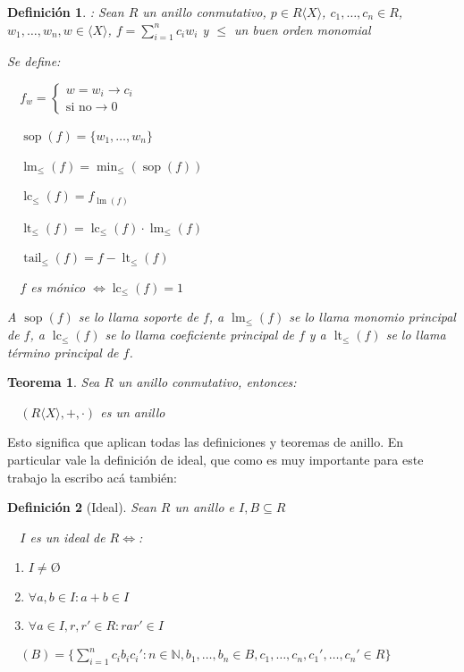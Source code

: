 \documentclass{amsbook}
\theoremstyle{customstyle}
\newtheorem{definition}{Definición}[section]
\newtheorem{theorem}{Teorema}[section]
\DeclareMathOperator{\sop}{sop}
\DeclareMathOperator{\lm}{lm}
\DeclareMathOperator{\lc}{lc}
\DeclareMathOperator{\lt}{lt}
\DeclareMathOperator{\tail}{tail}
\begin{document}
\begin{definition}: %
Sean $R$ un anillo conmutativo, $p ∈ R⟨X⟩$, $c_1, …, c_n ∈ R$, $w_1, …, w_n, w ∈ ⟨X⟩$, $f = \sum_{i = 1}^n c_i w_i$ y $≤$ un buen orden monomial

Se define:

  $f_w = \left\{\begin{array}{ll} w = w_i → c_i \\ \text{si no} → 0  \end{array} \right. $

  $\sop(f) = \{w_1, …, w_n\}$

  $\lm_≤(f) = \min_≤(\sop(f))$

  $\lc_≤(f) = f_{\lm(f)}$

  $\lt_≤(f) = \lc_≤(f) · \lm_≤(f)$

  $\tail_≤(f) = f - \lt_≤(f)$

  $f$ es mónico $⇔ \lc_≤(f) = 1$

A $\sop(f)$ se lo llama soporte de $f$, a $\lm_≤(f)$ se lo llama monomio principal de $f$, a $\lc_≤(f)$ se lo llama coeficiente principal de $f$ y a $\lt_≤(f)$ se lo llama término principal de $f$.

\end{definition}

\begin{theorem}
Sea $R$ un anillo conmutativo, entonces:

  $(R⟨X⟩, +, ·)$ es un anillo

\end{theorem}

Esto significa que aplican todas las definiciones y teoremas de anillo.
En particular vale la definición de ideal, que como es muy importante para este trabajo la escribo acá también:

\begin{definition}[Ideal]
Sean $R$ un anillo e $I, B ⊆ R$

  $I$ es un ideal de $R ⇔$:
\begin{enumerate}[label=(\alph*)]
\item $I ≠ Ø$

\item $∀a, b ∈ I : a + b ∈ I$

\item $∀a ∈ I, r, r' ∈ R : rar' ∈ I$
\end{enumerate}

  $(B) = \{\sum_{i = 1}^n c_i b_i c_i' : n ∈ ℕ, b_1, …, b_n ∈ B, c_1, …, c_n, c_1', …, c_n' ∈ R\}$
\end{definition}
\end{document}
